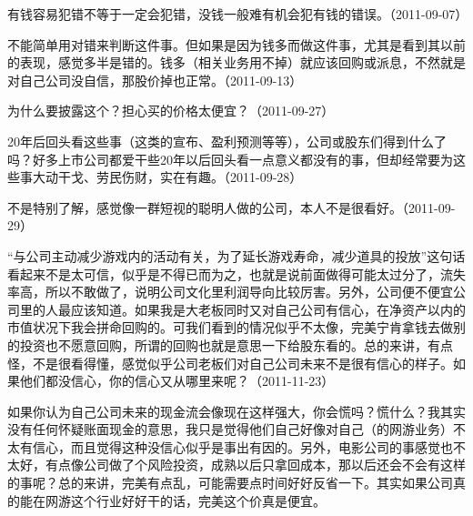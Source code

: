 
有钱容易犯错不等于一定会犯错，没钱一般难有机会犯有钱的错误。（2011-09-07）


不能简单用对错来判断这件事。但如果是因为钱多而做这件事，尤其是看到其以前的表现，感觉多半是错的。钱多（相关业务用不掉）就应该回购或派息，不然就是对自己公司没自信，那股价掉也正常。（2011-09-13）


为什么要披露这个？担心买的价格太便宜？（2011-09-27）


20年后回头看这些事（这类的宣布、盈利预测等等），公司或股东们得到什么了吗？好多上市公司都爱干些20年以后回头看一点意义都没有的事，但却经常要为这些事大动干戈、劳民伤财，实在有趣。（2011-09-28）


不是特别了解，感觉像一群短视的聪明人做的公司，本人不是很看好。（2011-09-29）


“与公司主动减少游戏内的活动有关，为了延长游戏寿命，减少道具的投放”这句话看起来不是太可信，似乎是不得已而为之，也就是说前面做得可能太过分了，流失率高，所以不敢做了，说明公司文化里利润导向比较厉害。另外，公司便不便宜公司里的人最应该知道。如果我是大老板同时又对自己公司有信心，在净资产以内的市值状况下我会拼命回购的。可我们看到的情况似乎不太像，完美宁肯拿钱去做别的投资也不愿意回购，所谓的回购也就是意思一下给股东看的。总的来讲，有点怪，不是很看得懂，感觉似乎公司老板们对自己公司未来不是很有信心的样子。如果他们都没信心，你的信心又从哪里来呢？（2011-11-23）


如果你认为自己公司未来的现金流会像现在这样强大，你会慌吗？慌什么？我其实没有任何怀疑账面现金的意思，我只是觉得他们自己好像对自己（的网游业务）不太有信心，而且觉得这种没信心似乎是事出有因的。另外，电影公司的事感觉也不太好，有点像公司做了个风险投资，成熟以后只拿回成本，那以后还会不会有这样的事呢？总的来讲，完美有点乱，可能需要点时间好好反省一下。其实如果公司真的能在网游这个行业好好干的话，完美这个价真是便宜。

